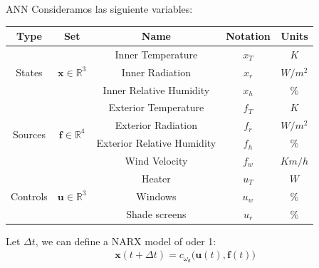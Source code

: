     \begin{model}{ANN}{}
        Consideramos las siguiente variables:
        \begin{center}
            \begin{tabular}{|c|c|c|c|c|}
                \hline
                \textbf{Type} & \textbf{Set} &\textbf{Name} & \textbf{Notation} & \textbf{Units} \\
                    \hline
                    \multirow{3}{*}{States} & 
                    \multirow{3}{*}{$\bm{x} \in \mathbb{R}^3$}&
                        Inner Temperature & $x_{T}$ & $K$ \\
                    & & Inner Radiation & $x_{r}$ & $W/m^2$ \\
                    & & Inner Relative Humidity & $x_{h}$ & $\%$\\
                    \hline
                    \hline
                    \multirow{4}{*}{Sources } &
                    \multirow{4}{*}{$\bm{f} \in \mathbb{R}^4$} &
                        Exterior Temperature & $f_{T}$ & $K$ \\
                    & & Exterior Radiation & $f_{r}$ & $W/m^2$ \\
                    & & Exterior Relative Humidity & $f_{h}$ & $\%$\\
                    & & Wind Velocity & $f_w$ & $Km/h$  \\
                    \hline
                    \hline
                    \multirow{3}{*}{Controls} &
                    \multirow{3}{*}{$\bm{u} \in \mathbb{R}^3$} &
                        Heater         & $u_{T}$ & $W$ \\
                    & & Windows        & $u_{w}$ & $\%$ \\
                    & & Shade screens  & $u_{r}$ & $\%$\\
                        \hline
            \end{tabular}  
        \end{center}
        
        Let $\Delta t$, we can define a NARX model of oder 1:
        \begin{gather}
            \bm{x}(t+\Delta t) = c_{\omega_d} \big(\bm{u}(t),\bm{f}(t) \big)
        \end{gather}
        
        \end{model}
    
